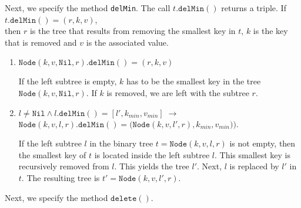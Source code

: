 Next, we specify the  method \texttt{delMin}.  The call $t.\texttt{delMin}()$ returns a triple.
If 
\\[0.2cm]
\hspace*{1.3cm}
$t.\texttt{delMin}() = (r,k,v)$,
\\[0.2cm]
then $r$ is the tree that  results from
removing the smallest key in $t$, $k$ is the key that is removed and $v$ is the associated value.
\begin{enumerate}
\item $\texttt{Node}(k, v, \texttt{Nil}, r).\texttt{delMin}() = (r, k, v)$

      If the left subtree is empty, $k$ has to be the smallest key in the tree 
      $\texttt{Node}(k, v, \texttt{Nil}, r)$.  If $k$ is removed, we are left with the subtree $r$.
\item $l\not= \texttt{Nil} \wedge l.\texttt{delMin}() = [l',k_{min}, v_{min}] \;\rightarrow$ \\[0.2cm]
       \hspace*{1.3cm} 
       $\texttt{Node}(k, v, l, r).\texttt{delMin}() = \bigl(\texttt{Node}(k, v, l', r), k_{min}, v_{min})\bigr)$.

      If the left subtree $l$ in the binary tree $t = \texttt{Node}(k, v, l, r)$
      is not empty, then the smallest key of  $t$ is located inside the left subtree $l$.
      This smallest key is recursively removed from  $l$. This yields the tree 
      $l'$.  Next,  $l$ is replaced by $l'$ in $t$.  The resulting tree is
      $t' = \texttt{Node}(k, v, l', r)$.
\end{enumerate}
Next, we specify the method $\mathtt{delete}()$.
